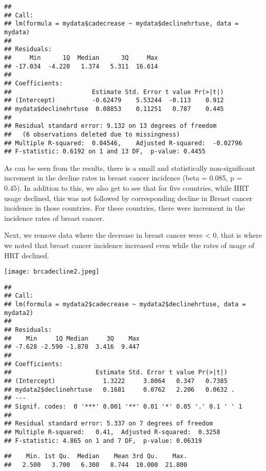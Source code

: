 \documentclass[]{article}
\begin{document}
\begin{verbatim}
## 
## Call:
## lm(formula = mydata$cadecrease ~ mydata$declinehrtuse, data = mydata)
## 
## Residuals:
##     Min      1Q  Median      3Q     Max 
## -17.034  -4.220   1.374   5.311  16.614 
## 
## Coefficients:
##                      Estimate Std. Error t value Pr(>|t|)
## (Intercept)          -0.62479    5.53244  -0.113    0.912
## mydata$declinehrtuse  0.08853    0.11251   0.787    0.445
## 
## Residual standard error: 9.132 on 13 degrees of freedom
##   (6 observations deleted due to missingness)
## Multiple R-squared:  0.04546,    Adjusted R-squared:  -0.02796 
## F-statistic: 0.6192 on 1 and 13 DF,  p-value: 0.4455
\end{verbatim}

As can be seen from the results, there is a small and statistically
non-significant increment in the decline rates in breast cancer
incidence (beta = 0.085, p = 0.45). In addition to this, we also get to
see that for five countries, while HRT usage declined, this was not
followed by corresponding decline in Breast cancer incidence in those
countries. For these countries, there were increment in the incidence
rates of breast cancer.

Next, we remove data where the decrease in breast cancer were
\textless{} 0, that is where we noted that breast cancer incidence
increased even while the rates of usage of HRT declined.

\texttt{[image: brcadecline2.jpeg]}

\begin{verbatim}
## 
## Call:
## lm(formula = mydata2$cadecrease ~ mydata2$declinehrtuse, data = mydata2)
## 
## Residuals:
##    Min     1Q Median     3Q    Max 
## -7.628 -2.590 -1.878  3.416  9.447 
## 
## Coefficients:
##                       Estimate Std. Error t value Pr(>|t|)  
## (Intercept)             1.3222     3.8064   0.347   0.7385  
## mydata2$declinehrtuse   0.1681     0.0762   2.206   0.0632 .
## ---
## Signif. codes:  0 '***' 0.001 '**' 0.01 '*' 0.05 '.' 0.1 ' ' 1
## 
## Residual standard error: 5.337 on 7 degrees of freedom
## Multiple R-squared:   0.41,  Adjusted R-squared:  0.3258 
## F-statistic: 4.865 on 1 and 7 DF,  p-value: 0.06319
\end{verbatim}

\begin{verbatim}
##    Min. 1st Qu.  Median    Mean 3rd Qu.    Max. 
##   2.500   3.700   6.300   8.744  10.000  21.800
\end{verbatim}
\end{document}
